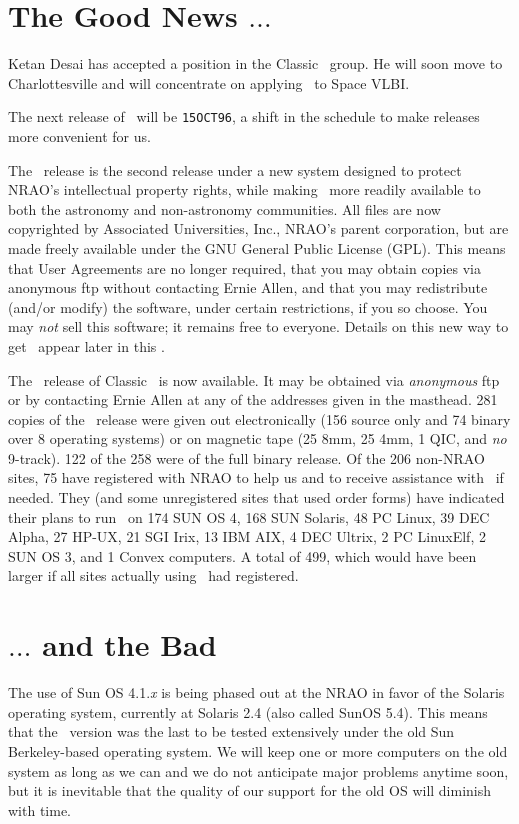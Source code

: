 \section{The Good News $\ldots$}

Ketan Desai has accepted a position in the Classic \AIPS\ group.  He
will soon move to Charlottesville and will concentrate on applying
\AIPS\ to Space \hbox{VLBI}.

The next release of \AIPS\ will be {\tt 15OCT96}, a shift in the
schedule to make releases more convenient for us.

The \RELEASENAME\ release is the second release under a new system
designed to protect NRAO's intellectual property rights, while making
\AIPS\ more readily available to both the astronomy and non-astronomy
communities.  All files are now copyrighted by Associated
Universities, Inc., NRAO's parent corporation, but are made freely
available under the GNU General Public License \hbox{(GPL)}.  This
means that User Agreements are no longer required, that you may obtain
copies via anonymous ftp without contacting Ernie Allen, and that you
may redistribute (and/or modify) the software, under certain
restrictions, if you so choose.  You may {\it not} sell this software;
it remains free to everyone.  Details on this new way to get \AIPS\
appear later in this \Aipsletter.

The \RELEASENAME\ release of Classic \AIPS\ is now available.  It may
be obtained via {\it anonymous} ftp or by contacting Ernie Allen at
any of the addresses given in the masthead.  281 copies of the
\OLDNAME\ release were given out electronically (156 source only and
74 binary over 8 operating systems) or on magnetic tape (25 8mm, 25
4mm, 1 QIC, and {\it no} 9-track).  122 of the 258 were of the full
binary release.  Of the 206 non-NRAO sites, 75 have registered with
NRAO to help us and to receive assistance with \OLDNAME\ if needed.
They (and some unregistered sites that used order forms) have
indicated their plans to run \AIPS\ on 174 SUN OS 4, 168 SUN Solaris,
48 PC Linux, 39 DEC Alpha, 27 HP-UX, 21 SGI Irix, 13 IBM AIX, 4 DEC
Ultrix, 2 PC LinuxElf, 2 SUN OS 3, and 1 Convex computers. A total of
499, which would have been larger if all sites actually using \AIPS\
had registered.

\section{$\ldots$ and the Bad}

The use of Sun OS 4.1.{\it x} is being phased out at the NRAO in favor
of the Solaris operating system, currently at Solaris 2.4 (also called
SunOS 5.4).  This means that the \OLDNAME\ version was the
last to be tested extensively under the old Sun Berkeley-based
operating system.  We will keep one or more computers on the old
system as long as we can and we do not anticipate major problems
anytime soon, but it is inevitable that the quality of our support for
the old OS will diminish with time.

